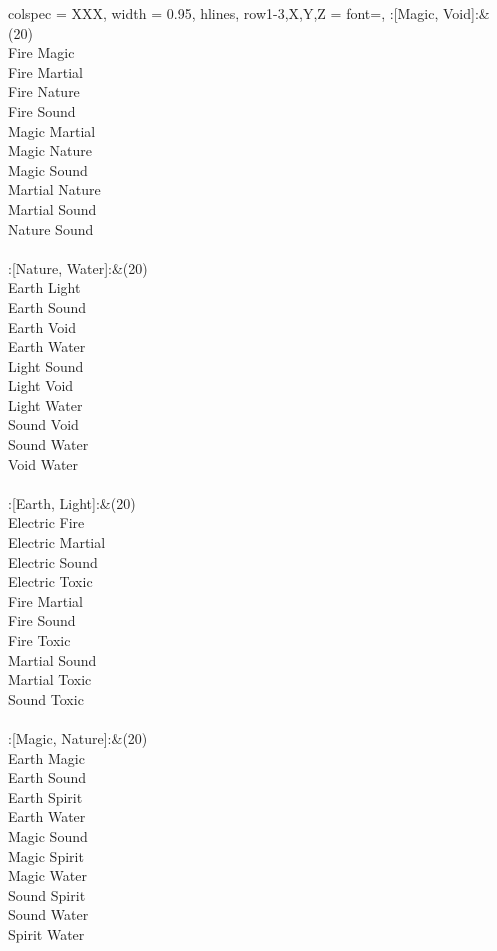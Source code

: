 \begin{longtblr}[
	caption = {2v2 Defending Resisted},
	label = {2v2-Defending-Resisted},
]{
	colspec = {XXX}, width = 0.95\linewidth,
	hlines,
	row{1-3,X,Y,Z} = {font=\bfseries},
}
	:[Magic, Void]:&{(20)\\
	Fire Magic \\
	Fire Martial \\
	Fire Nature \\
	Fire Sound \\
	Magic Martial \\
	Magic Nature \\
	Magic Sound \\
	Martial Nature \\
	Martial Sound \\
	Nature Sound \\
	}\\

	:[Nature, Water]:&{(20)\\
	Earth Light \\
	Earth Sound \\
	Earth Void \\
	Earth Water \\
	Light Sound \\
	Light Void \\
	Light Water \\
	Sound Void \\
	Sound Water \\
	Void Water \\
	}\\

	:[Earth, Light]:&{(20)\\
	Electric Fire \\
	Electric Martial \\
	Electric Sound \\
	Electric Toxic \\
	Fire Martial \\
	Fire Sound \\
	Fire Toxic \\
	Martial Sound \\
	Martial Toxic \\
	Sound Toxic \\
	}\\

	:[Magic, Nature]:&{(20)\\
	Earth Magic \\
	Earth Sound \\
	Earth Spirit \\
	Earth Water \\
	Magic Sound \\
	Magic Spirit \\
	Magic Water \\
	Sound Spirit \\
	Sound Water \\
	Spirit Water \\
	}\\


\end{longtblr}
